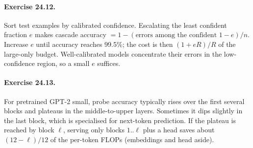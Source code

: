 \paragraph{Exercise 24.12.} Sort test examples by calibrated confidence. Escalating the
least confident fraction $e$ makes cascade accuracy
$=1-(\text{errors among the confident }1-e)/n$. Increase $e$ until accuracy reaches
99.5\%; the cost is then $(1+eR)/R$ of the large-only budget. Well-calibrated models
concentrate their errors in the low-confidence region, so a small $e$ suffices.

\paragraph{Exercise 24.13.} For pretrained GPT-2 small, probe accuracy typically rises over
the first several blocks and plateaus in the middle-to-upper layers. Sometimes it dips
slightly in the last block, which is specialised for next-token prediction. If the
plateau is reached by block $\ell$, serving only blocks $1..\ell$ plus a head saves
about $(12-\ell)/12$ of the per-token FLOPs (embeddings and head aside).
